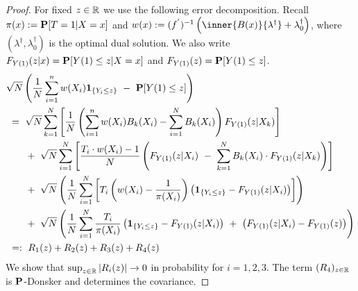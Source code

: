 \begin{proof}
  For fixed $z\in\R$ we use the following error decomposition.
  Recall $\pi(x):=\P[T=1|X=x]$ and
  $
  w(x)
  :=
  (
  f^{'}
  )^{-1}
  \left( 
    \inner{B(x)}{\lambda^\dagger}
    +
    \lambda_0^\dagger
  \right)
  $,
  where $(\lambda^\dagger,\lambda_0^\dagger)$ is the optimal dual solution.
  We also write
  $
  F_{Y(1)}(z|x)
  =
  \P[Y(1)\le z|X=x]
  $
  and
  $
  F_{Y(1)}(z)
  =
  \P[Y(1)\le z]
  $.
\begin{align*}
  &
  \sqrt{N}
\left( 
    \frac{1}{N}
    \sum_{i=1}^{n} 
    w(X_i)
    \mathbf{1}_{\left\{ Y_i \le z \right\}}
    \ 
    -
    \ 
    \P[Y(1)\le z]
\right)
    \\
  &
  \ 
  =
  \ 
  \sqrt{N}
  \sum_{k=1}^{N} 
  \left[ 
  \frac{1}{N}
  \left( 
    \sum_{i=1}^{n} 
    w(X_i)
    B_k(X_i)
    -
    \sum_{i=1}^{N} 
    B_k(X_i)
  \right)
  F_{Y(1)}(z|X_k)
  \right]
  \\
  &
  \qquad
  +
  \ 
  \sqrt{N}
    \sum_{i=1}^{N} 
    \left[ 
  \frac{
    T_i\cdot w(X_i) -1 }{N}
    \left( 
  F_{Y(1)}(z|X_i)
    \ 
    -
    \ 
    \sum_{k=1}^{N} 
    B_k(X_i)
    \cdot
  F_{Y(1)}(z|X_k)
    \right)
    \right]
  \\
  &
  \qquad
  +
  \ 
  \sqrt{N}
  \left( 
  \frac{1}{N}
    \sum_{i=1}^{N} 
    \left[ 
    T_i
    \left( 
    w(X_i) 
    -
    \frac{1}{\pi(X_i)}
    \right)
    \left( 
    \mathbf{1}_{\left\{ Y_i \le z \right\}}
    -
  F_{Y(1)}(z|X_i)
    \right)
    \right]
  \right)
  \\
  &
  \qquad
  +
  \ 
  \sqrt{N}
  \left( 
  \frac{1}{N}
    \sum_{i=1}^{N} 
    \frac{T_i}{\pi(X_i)}
    \left( 
    \mathbf{1}_{\left\{ Y_i \le z \right\}}
    -
  F_{Y(1)}(z|X_i)
    \right)
    \ 
    +
    \ 
    \left( 
  F_{Y(1)}(z|X_i)
    -
  F_{Y(1)}(z)
    \right)
  \right)
  \\
  &
  \ 
  =:
  \ 
  R_1(z)
  +
  R_2(z)
  +
  R_3(z)
  +
  R_4(z)
  \end{align*}
  We show that $\sup_{z\in\R}\left| R_i(z) \right|\to 0 $ in
  probability for $i=1,2,3$.
  The term $(R_4)_{z\in\R}$ is $\P$-Donsker and determines the 
  covariance.
\end{proof}
